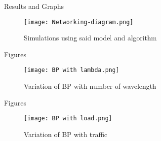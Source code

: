 \documentclass{beamer}
\begin{document}
\begin{frame}{Results and Graphs}
  \begin{figure}[!]
    \centering
    \texttt{[image: Networking-diagram.png]}
    \caption{Simulations using said model and algorithm}
  \end{figure}
\end{frame}
\begin{frame}{Figures}
  \begin{figure}[!]
    \centering
    \texttt{[image: BP with lambda.png]}
    \caption{Variation of BP with number of wavelength}
  \end{figure}
\end{frame}
\begin{frame}{Figures}
  \begin{figure}[!]
    \centering
    \texttt{[image: BP with load.png]}
    \caption{Variation of BP with traffic}
  \end{figure}
\end{frame}
\end{document}
